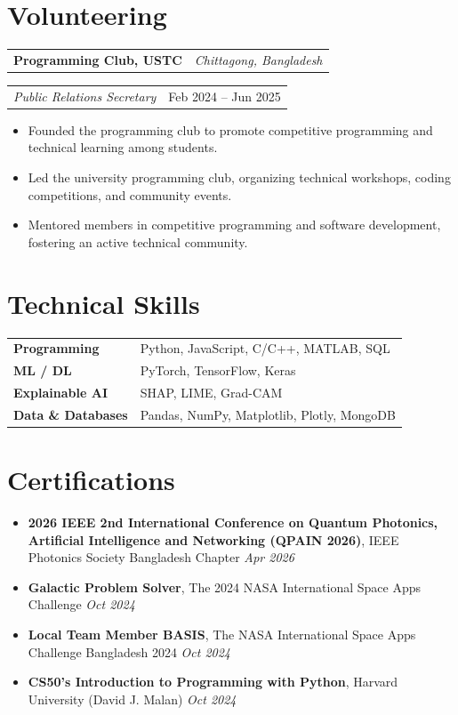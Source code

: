 \documentclass[10pt]{article}
\makeatletter
\newcommand{\entry}[2]{%
  \noindent\begin{tabularx}{\linewidth}{@{}X r@{}}
    \textbf{#1} & \textit{\small #2}
  \end{tabularx}\vspace{-1pt}
}
\newcommand{\subentry}[2]{%
  \noindent\begin{tabularx}{\linewidth}{@{}X r@{}}
    \textit{\small #1} & {\small #2}
  \end{tabularx}\vspace{1pt}
}
\makeatother
\begin{document}
\section{Volunteering}
\entry{Programming Club, USTC}{Chittagong, Bangladesh}
\subentry{Public Relations Secretary}{Feb 2024 -- Jun 2025}
\begin{itemize}
    \item Founded the programming club to promote competitive programming and technical learning among students.
    \item Led the university programming club, organizing technical workshops, coding competitions, and community events.
    \item Mentored members in competitive programming and software development, fostering an active technical community.
\end{itemize}
\vspace{4pt}

\section{Technical Skills}
\begin{tabularx}{\linewidth}{@{}l X@{}}
  \textbf{Programming} & Python, JavaScript, C/C++, MATLAB, SQL \\[2pt]
  \textbf{ML / DL} & PyTorch, TensorFlow, Keras \\[2pt]
  \textbf{Explainable AI} &  SHAP, LIME, Grad-CAM \\[2pt]
  \textbf{Data \& Databases} & Pandas, NumPy, Matplotlib, Plotly, MongoDB\\
\end{tabularx}

\section{Certifications}
\begin{itemize}
  \item \textbf{2026 IEEE 2nd International Conference on Quantum Photonics, Artificial Intelligence and Networking (QPAIN 2026)}, IEEE Photonics Society Bangladesh Chapter \hfill \textit{Apr 2026}
  \item \textbf{Galactic Problem Solver}, The 2024 NASA International Space Apps Challenge \hfill \textit{Oct 2024}
  \item \textbf{Local Team Member BASIS}, The NASA International Space Apps Challenge Bangladesh 2024 \hfill \textit{Oct 2024}
  \item \textbf{CS50’s Introduction to Programming with Python}, Harvard University (David J. Malan) \hfill \textit{Oct 2024}
\end{itemize}
\end{document}
